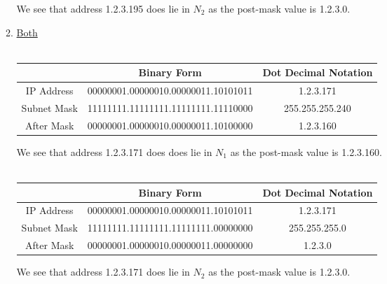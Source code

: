 \documentclass[12pt]{article}
\begin{document}
\begin{enumerate}
\begin{enumerate}
        We see that address 1.2.3.195 does lie in $N_2$ as the post-mask value is 1.2.3.0. \\
        
        \item \underline{Both}\\ \\
        \begin{tabular}{ |c|c|c| } 
         \hline
         & Binary Form & Dot Decimal Notation \\ 
         \hline
         IP Address & 00000001.00000010.00000011.10101011 & 1.2.3.171 \\ 
         Subnet Mask & 11111111.11111111.11111111.11110000 & 255.255.255.240 \\
         After Mask & 00000001.00000010.00000011.10100000 & 1.2.3.160 \\
         \hline
        \end{tabular}
        
        We see that address 1.2.3.171 does does lie in $N_1$ as the post-mask value is 1.2.3.160. \\ \\
        \begin{tabular}{ |c|c|c| } 
         \hline
         & Binary Form & Dot Decimal Notation \\ 
         \hline
         IP Address & 00000001.00000010.00000011.10101011 & 1.2.3.171 \\ 
         Subnet Mask & 11111111.11111111.11111111.00000000 & 255.255.255.0 \\
         After Mask & 00000001.00000010.00000011.00000000 & 1.2.3.0 \\
         \hline
        \end{tabular}
        
        We see that address 1.2.3.171 does lie in $N_2$ as the post-mask value is 1.2.3.0.
    \end{enumerate}
\end{enumerate}
\end{document}
